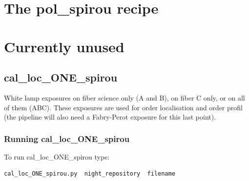 



\clearpage
\newpage
\section{The pol\_spirou recipe}
\label{section:pol_spirou}



\clearpage
\newpage
\section{Currently unused}

\subsection{cal\_loc\_ONE\_spirou}

White lamp exposures on fiber science only (A and B), on fiber C only, or on all of them (ABC). These exposures are used for order localisation and order profil (the pipeline will also need a Fabry-Perot exposure for this last point).

\subsubsection{Running cal\_loc\_ONE\_spirou}

To run cal\_loc\_ONE\_spirou type:
\begin{lstlisting}[language=bash, style=bashstyle]
cal_loc_ONE_spirou.py  night_repository  filename
\end{lstlisting}


